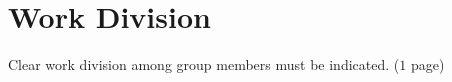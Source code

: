 
\chapter{Work Division}
\label{Chapter9}

Clear work division among group members must be indicated. ($1$ page)
